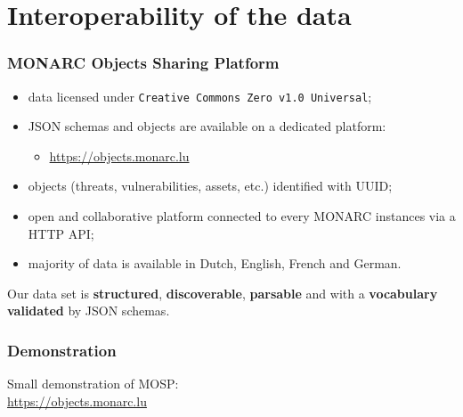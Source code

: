 \documentclass[]{beamer}
\begin{document}
\section{Interoperability of the data}
\begin{frame}
    \frametitle{MONARC Objects Sharing Platform}
    \begin{center}
        \begin{itemize}
            \item data licensed under \texttt{Creative Commons Zero v1.0 Universal};
            \item JSON schemas and objects are available on a dedicated platform:\\
            \begin{itemize}
                \item \url{https://objects.monarc.lu}
            \end{itemize}
            \item objects (threats, vulnerabilities, assets, etc.) identified with UUID;
            \item open and collaborative platform connected to every MONARC instances via a HTTP API;
            \item majority of data is available in Dutch, English, French and German.
        \end{itemize}
    \end{center}
    \bigskip
    Our data set is \textbf{structured}, \textbf{discoverable}, \textbf{parsable} and
    with a \textbf{vocabulary validated} by JSON schemas.
\end{frame}

\begin{frame}
    \frametitle{Demonstration}
    Small demonstration of MOSP:\\
    \url{https://objects.monarc.lu}
\end{frame}
\end{document}

